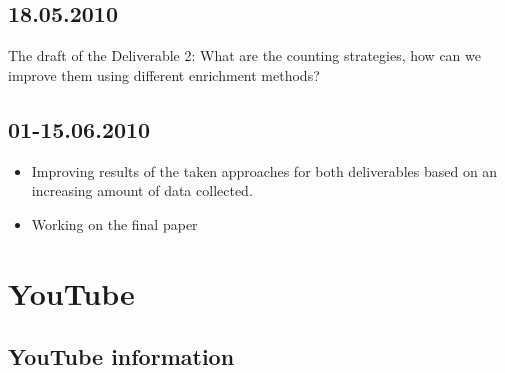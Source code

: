 \documentclass{article}
\begin{document}
\subsection{18.05.2010}
The draft of the Deliverable 2:
What are the counting strategies, how can we improve them using different
enrichment methods?

\subsection{01-15.06.2010}
\begin{itemize}
\item{Improving results of the taken approaches for both deliverables based on an
increasing amount of data collected.}
\item{Working on the final paper}
\end{itemize}

\newpage
\section{YouTube}

\subsection{YouTube information}
\end{document}

